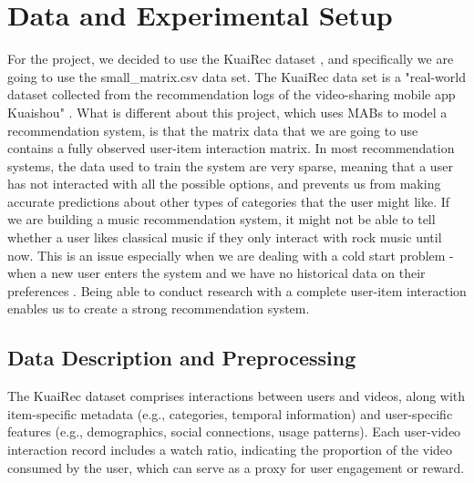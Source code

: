 \section{Data and Experimental Setup}


For the project, we decided to use the KuaiRec dataset \cite{gao2022kuairec}, and specifically we are going to use the small\_matrix.csv data set. The KuaiRec data set is a "real-world dataset collected from the recommendation logs of the video-sharing mobile app Kuaishou" \cite{gao2022kuairec}. What is different about this project, which uses MABs to model a recommendation system, is that the matrix data that we are going to use contains a fully observed user-item interaction matrix. In most recommendation systems, the data used to train the system are very sparse, meaning that a user has not interacted with all the possible options, and prevents us from making accurate predictions about other types of categories that the user might like. If we are building a music recommendation system, it might not be able to tell whether a user likes classical music if they only interact with rock music until now. This is an issue especially when we are dealing with a cold start problem - when a new user enters the system and we have no historical data on their preferences \cite{nath2023_medium}. Being able to conduct research with a complete user-item interaction enables us to create a strong recommendation system.


\subsection{Data Description and Preprocessing}

The KuaiRec dataset comprises interactions between users and videos, along with item-specific metadata (e.g., categories, temporal information) and user-specific features (e.g., demographics, social connections, usage patterns). Each user-video interaction record includes a watch ratio, indicating the proportion of the video consumed by the user, which can serve as a proxy for user engagement or reward.

